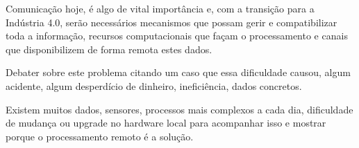 Comunicação hoje, é algo de vital importância e, com a transição para a Indústria 4.0, serão necessários mecanismos que possam gerir e compatibilizar toda a informação, recursos computacionais que façam o processamento e canais que disponibilizem de forma remota estes dados.

Debater sobre este problema citando um caso que essa dificuldade causou, algum acidente, algum desperdício de dinheiro, ineficiência, dados concretos.

Existem muitos dados, sensores, processos mais complexos a cada dia, dificuldade de mudança ou upgrade no hardware local para acompanhar isso e mostrar porque o processamento remoto é a solução.


